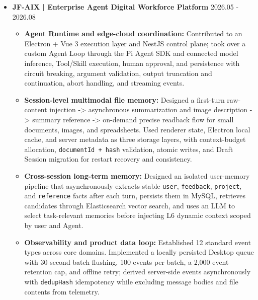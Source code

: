 \documentclass{resume}
\begin{document}
\begin{itemize}
  \item \textbf{JF-AIX | Enterprise Agent Digital Workforce Platform} \hfill 2026.05 - 2026.08
  \begin{itemize}
    \item \textbf{Agent Runtime and edge-cloud coordination:} Contributed to an Electron + Vue 3 execution layer and NestJS control plane; took over a custom Agent Loop through the Pi Agent SDK and connected model inference, Tool/Skill execution, human approval, and persistence with circuit breaking, argument validation, output truncation and continuation, abort handling, and streaming events.
    \item \textbf{Session-level multimodal file memory:} Designed a first-turn raw-content injection -> asynchronous summarization and image description -> summary reference -> on-demand precise readback flow for small documents, images, and spreadsheets. Used renderer state, Electron local cache, and server metadata as three storage layers, with context-budget allocation, \texttt{documentId + hash} validation, atomic writes, and Draft Session migration for restart recovery and consistency.
    \item \textbf{Cross-session long-term memory:} Designed an isolated user-memory pipeline that asynchronously extracts stable \texttt{user}, \texttt{feedback}, \texttt{project}, and \texttt{reference} facts after each turn, persists them in MySQL, retrieves candidates through Elasticsearch vector search, and uses an LLM to select task-relevant memories before injecting L6 dynamic context scoped by user and Agent.
    \item \textbf{Observability and product data loop:} Established 12 standard event types across core domains. Implemented a locally persisted Desktop queue with 30-second batch flushing, 100 events per batch, a 2,000-event retention cap, and offline retry; derived server-side events asynchronously with \texttt{dedupHash} idempotency while excluding message bodies and file contents from telemetry.
  \end{itemize}
\end{itemize}
\end{document}
